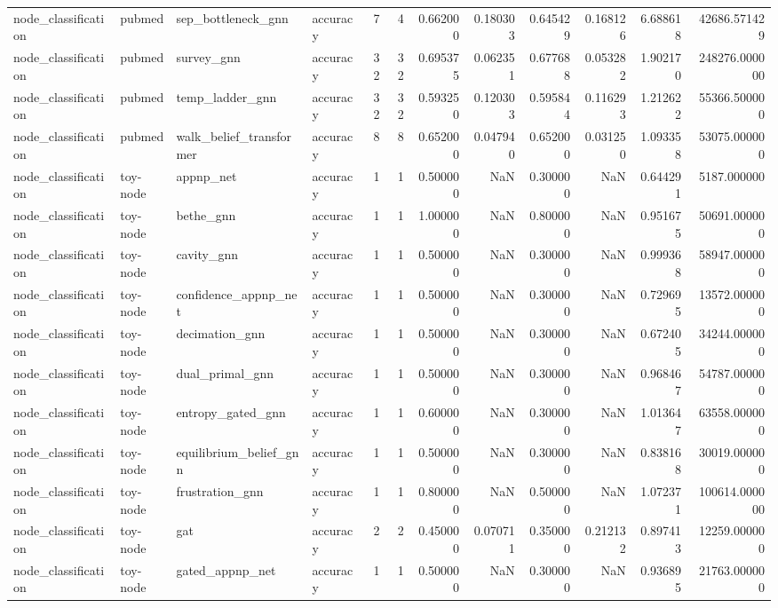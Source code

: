 \begin{tabular}{llllrrrrrrrr}
node_classification & pubmed & sep_bottleneck_gnn & accuracy & 7 & 4 & 0.662000 & 0.180303 & 0.645429 & 0.168126 & 6.688618 & 42686.571429 \\
node_classification & pubmed & survey_gnn & accuracy & 32 & 32 & 0.695375 & 0.062351 & 0.677688 & 0.053282 & 1.902170 & 248276.000000 \\
node_classification & pubmed & temp_ladder_gnn & accuracy & 32 & 32 & 0.593250 & 0.120303 & 0.595844 & 0.116293 & 1.212622 & 55366.500000 \\
node_classification & pubmed & walk_belief_transformer & accuracy & 8 & 8 & 0.652000 & 0.047940 & 0.652000 & 0.031250 & 1.093358 & 53075.000000 \\
node_classification & toy-node & appnp_net & accuracy & 1 & 1 & 0.500000 & NaN & 0.300000 & NaN & 0.644291 & 5187.000000 \\
node_classification & toy-node & bethe_gnn & accuracy & 1 & 1 & 1.000000 & NaN & 0.800000 & NaN & 0.951675 & 50691.000000 \\
node_classification & toy-node & cavity_gnn & accuracy & 1 & 1 & 0.500000 & NaN & 0.300000 & NaN & 0.999368 & 58947.000000 \\
node_classification & toy-node & confidence_appnp_net & accuracy & 1 & 1 & 0.500000 & NaN & 0.300000 & NaN & 0.729695 & 13572.000000 \\
node_classification & toy-node & decimation_gnn & accuracy & 1 & 1 & 0.500000 & NaN & 0.300000 & NaN & 0.672405 & 34244.000000 \\
node_classification & toy-node & dual_primal_gnn & accuracy & 1 & 1 & 0.500000 & NaN & 0.300000 & NaN & 0.968467 & 54787.000000 \\
node_classification & toy-node & entropy_gated_gnn & accuracy & 1 & 1 & 0.600000 & NaN & 0.300000 & NaN & 1.013647 & 63558.000000 \\
node_classification & toy-node & equilibrium_belief_gnn & accuracy & 1 & 1 & 0.500000 & NaN & 0.300000 & NaN & 0.838168 & 30019.000000 \\
node_classification & toy-node & frustration_gnn & accuracy & 1 & 1 & 0.800000 & NaN & 0.500000 & NaN & 1.072371 & 100614.000000 \\
node_classification & toy-node & gat & accuracy & 2 & 2 & 0.450000 & 0.070711 & 0.350000 & 0.212132 & 0.897413 & 12259.000000 \\
node_classification & toy-node & gated_appnp_net & accuracy & 1 & 1 & 0.500000 & NaN & 0.300000 & NaN & 0.936895 & 21763.000000 \\

\end{tabular}
